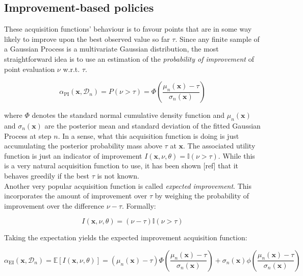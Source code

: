 \documentclass[10pt,a4paper,twoside]{book}
\begin{document}
\subsection{Improvement-based policies}

These acquisition functions' behaviour is to favour points that are in some way likely to improve upon the best observed value so far $\tau$. Since any finite sample of a Gaussian Process is a multivariate Gaussian distribution, the most straightforward idea is to use an estimation of the \textit{probability of improvement} of point evaluation $\nu$ w.r.t. $\tau$.

\begin{equation}
\alpha_{\mathrm{PI}}(\boldsymbol{x}, \mathcal{D}_n) = P\left(\nu > \tau\right) = \Phi\left(\dfrac{\mu_n(\boldsymbol{x}) - \tau}{\sigma_n(\boldsymbol{x})}  \right)
\end{equation}

where $\Phi$ denotes the standard normal cumulative density function and $\mu_n(\boldsymbol{x})$ and $\sigma_n(\boldsymbol{x})$ are the posterior mean and standard deviation of the fitted Gaussian Process at step $n$. In a sense, what this acquisition function is doing is just accumulating the posterior probability mass above $\tau$ at $\boldsymbol{x}$. The associated utility function is just an indicator of improvement $I(\boldsymbol{x},\nu, \theta) = \mathbb{I}(\nu > \tau)$. While this is a very natural acquisition function to use, it has been shown [ref] that it behaves greedily if the best $\tau$ is not known. \\

Another very popular acquisition function is called \textit{expected improvement}. This incorporates the amount of improvement over $\tau$ by weighing the probability of improvement over the difference $\nu - \tau$. Formally:

\begin{equation}
I(\boldsymbol{x}, \nu, \theta) = (\nu - \tau)\mathbb{I}(\nu > \tau)
\end{equation}

Taking the expectation yields the expected improvement acquisition function:

\begin{equation}
\alpha_{\mathrm{EI}}(\boldsymbol{x}, \mathcal{D}_n) = \mathbb{E}\left[I(\boldsymbol{x}, \nu, \theta)\right] = (\mu_n(\boldsymbol{x}) - \tau)\Phi\left(\dfrac{\mu_n(\boldsymbol{x}) - \tau}{\sigma_n(\boldsymbol{x})}  \right) + \sigma_n(\boldsymbol{x})\phi\left( \dfrac{\mu_n(\boldsymbol{x}) - \tau}{\sigma_n(\boldsymbol{x})} \right)
\end{equation}
\end{document}

